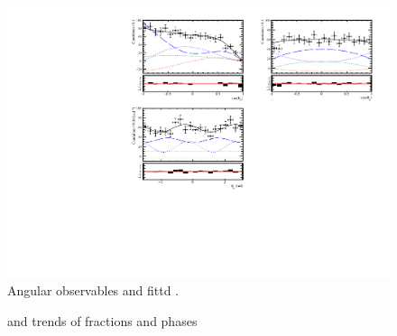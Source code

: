 \begin{figure}[h]
\begin{center}
  \includegraphics[width=\textwidth]{Figures/Chapter4/canv_Bs_allKaons_3fb_mergeAccPer_allKpiBins_AcpZero_Pw_split}
  \caption{Angular observables and fittd \pdf. {\color{red}{explain curves}}}
  \label{angular_plot}
\end{center}
\end{figure}

\begin{figure}[h]
  \centering
  \begin{subfigure}{0.5\textwidth}
    \scalebox{0.60}{}
    \caption{}
    \label{skase}
  \end{subfigure}%
  \hfill%
  \begin{subfigure}{0.5\textwidth}
    \scalebox{0.60}{}
    \caption{}
    \label{opasd}
  \end{subfigure}
  \begin{subfigure}{0.5\textwidth}
    \scalebox{0.60}{}
    \caption{}
    \label{opa}
  \end{subfigure}%
\caption{\pwave and \swave trends of \BsJpsiKst \BdJpsiKst fractions and phases}
\end{figure}

